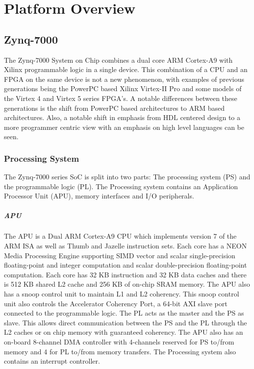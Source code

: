 


\chapter{Platform Overview}

\section{Zynq-7000}

The Zynq-7000 System on Chip combines a dual core ARM Cortex-A9 with Xilinx programmable logic in a single device. This combination of a CPU and an FPGA on the same device is not a new phenomenon, with examples of previous generations being the PowerPC based Xilinx Virtex-II Pro and some models of the Virtex 4 and Virtex 5 series FPGA's. A notable differences between these generations is the shift from PowerPC based architectures to ARM based architectures. Also, a notable shift in emphasis from HDL centered design to a more programmer centric view with an emphasis on high level languages can be seen. 
	

	\subsection{Processing System}
	The Zynq-7000 series SoC is split into two parts: The processing system (PS) and the programmable logic (PL). The Processing system contains an Application Processor Unit (APU), memory interfaces and I/O peripherals. 
	
		\paragraph{APU}
		The APU is a Dual ARM Cortex-A9 CPU which implements version 7 of the ARM ISA  as well as Thumb and Jazelle instruction sets. Each core has a NEON Media Processing Engine supporting SIMD vector and scalar single-precision floating-point and integer computation and scalar double-precision floating-point computation. Each core has 32 KB instruction and 32 KB data caches and there is 512 KB shared L2 cache and 256 KB of on-chip SRAM memory. The APU also has a snoop control unit to maintain L1 and L2 coherency. This snoop control unit also controls the Accelerator Coherency Port, a 64-bit AXI slave port connected to the programmable logic. The PL acts as the master and the PS as slave. This allows direct communication between the PS and the PL through the L2 caches or on chip memory with guaranteed coherency. The APU also has an on-board 8-channel DMA controller with 4-channels reserved for PS to/from memory and 4 for PL to/from memory transfers. The Processing system also contains an interrupt controller.

